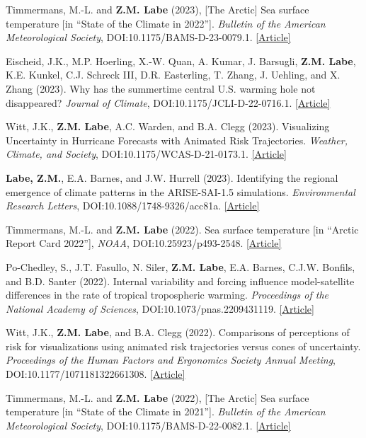 \documentclass[margin,line,palatino,courier,10pt]{res}
\begin{document}
\begin{resume}
\begin{etaremune}[leftmargin=0in,topsep=0in,parsep=0in]
\item Timmermans, M.-L. and \textbf{Z.M. Labe} (2023), [The Arctic] Sea surface temperature [in ``State of the Climate in 2022'']. \textit{Bulletin of the American Meteorological Society}, DOI:10.1175/BAMS-D-23-0079.1. \href{https://doi.org/10.1175/BAMS-D-23-0079.1}{[Article]}
\item Eischeid, J.K., M.P. Hoerling, X.-W. Quan, A. Kumar, J. Barsugli, \textbf{Z.M. Labe}, K.E. Kunkel, C.J. Schreck III, D.R. Easterling, T. Zhang, J. Uehling, and X. Zhang (2023). Why has the summertime central U.S. warming hole not disappeared? \textit{Journal of Climate}, DOI:10.1175/JCLI-D-22-0716.1. \href{https://doi.org/10.1175/JCLI-D-22-0716.1}{[Article]}
\item Witt, J.K., \textbf{Z.M. Labe}, A.C. Warden, and B.A. Clegg (2023). Visualizing Uncertainty in Hurricane Forecasts with Animated Risk Trajectories. \textit{Weather, Climate, and Society}, DOI:10.1175/WCAS-D-21-0173.1. \href{https://journals.ametsoc.org/view/journals/wcas/aop/WCAS-D-21-0173.1/WCAS-D-21-0173.1.xml}{[Article]}
\item \textbf{Labe, Z.M.}, E.A. Barnes, and J.W. Hurrell (2023). Identifying the regional emergence of climate patterns in the ARISE-SAI-1.5 simulations. \textit{Environmental Research Letters}, DOI:10.1088/1748-9326/acc81a. \href{https://iopscience.iop.org/article/10.1088/1748-9326/acc81a}{[Article]}
\item Timmermans, M.-L. and \textbf{Z.M. Labe} (2022). Sea surface temperature [in ``Arctic Report Card 2022''], \textit{NOAA}, DOI:10.25923/p493-2548. \href{https://arctic.noaa.gov/Report-Card/Report-Card-2022/ArtMID/8054/ArticleID/988/Sea-Surface-Temperature}{[Article]}
\item Po-Chedley, S., J.T. Fasullo, N. Siler, \textbf{Z.M. Labe}, E.A. Barnes, C.J.W. Bonfils, and B.D. Santer (2022). Internal variability and forcing influence model-satellite differences in the rate of tropical tropospheric warming. \textit{Proceedings of the National Academy of Sciences}, DOI:10.1073/pnas.2209431119. \href{https://www.pnas.org/doi/10.1073/pnas.2209431119}{[Article]}
\item Witt, J.K., \textbf{Z.M. Labe}, and B.A. Clegg (2022). Comparisons of perceptions of risk for visualizations using animated risk trajectories versus cones of uncertainty. \textit{Proceedings of the Human Factors and Ergonomics Society Annual Meeting}, DOI:10.1177/1071181322661308. \href{https://doi.org/10.1177/1071181322661308}{[Article]}
\item Timmermans, M.-L. and \textbf{Z.M. Labe} (2022), [The Arctic] Sea surface temperature [in ``State of the Climate in 2021'']. \textit{Bulletin of the American Meteorological Society}, DOI:10.1175/BAMS-D-22-0082.1. \href{https://doi.org/10.1175/BAMS-D-22-0082.1}{[Article]}

\end{etaremune}
\end{resume}
\end{document}
